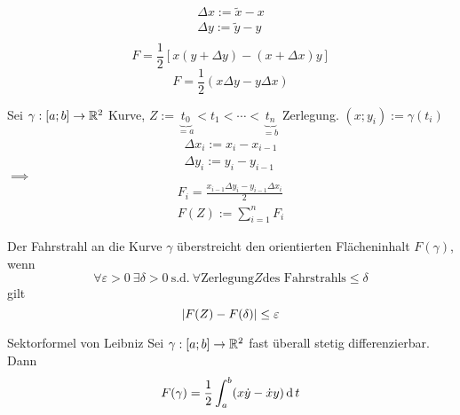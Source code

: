 \begin{Not}
  \begin{align*}
    \Delta x:=\tilde{x}-x\\
    \Delta y:=\tilde{y}-y\\
  \end{align*}
  \[F=\frac{1}{2}\left[ x(y+\Delta y)-(x+\Delta x)y\right]\]
  \[F=\frac{1}{2}\left( x\Delta y-y\Delta x \right)\]
\end{Not}
\begin{Bew}
  Sei $\gamma:[a;b]\to\mathbb{R}^2$ Kurve, $Z:=\underbrace{t_0}_{=a}<t_1<\cdots<\underbrace{t_n}_{=b}$ Zerlegung. $(x;y_i):=\gamma(t_i)$
  \begin{align*}
    \Delta x_i:=x_i-x_{i-1}\\
    \Delta y_i:=y_i-y_{i-1}
  \end{align*}
  $\implies$
  \begin{align*}
    F_i=\frac{x_{i-1}\Delta y_i-y_{i-1}\Delta x_i}{2}\\
    F(Z):=\sum^n_{i=1}F_i
  \end{align*}
\end{Bew}
\begin{Def}
  Der Fahrstrahl an die Kurve $\gamma$ überstreicht den orientierten Flächeninhalt $F(\gamma)$, wenn
  \[\forall \varepsilon>0\ \exists \delta>0\ \text{s.d.}\ \forall \text{Zerlegung} Z \text{des Fahrstrahls} \leq \delta\]
  gilt
  \[\left| F(Z)-F(\delta) \right|\leq \varepsilon\]
\end{Def}
\begin{Sat}{Sektorformel von Leibniz}
  Sei $\gamma:[a;b]\to\mathbb{R}^2$ fast überall stetig differenzierbar. Dann
  \[F(\gamma)=\frac{1}{2}\int^b_a(x\dot y-\dot xy)\operatorname{d} t\]
\end{Sat}
